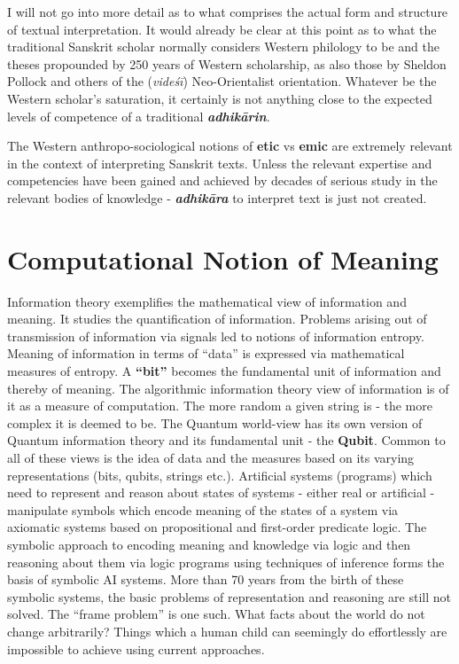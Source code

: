 I will not go into more detail as to what comprises the actual form and structure of textual interpretation. It would already be clear at this point as to what the traditional Sanskrit scholar normally considers Western philology to be and the theses propounded by 250 years of Western scholarship, as also those by Sheldon Pollock and others of the (\textit{videśī}) Neo-Orientalist orientation. Whatever be the Western scholar’s saturation, it certainly is not anything close to the expected levels of competence of a traditional \textbf{\textit{adhikārin}}.

The Western anthropo-sociological notions of \textbf{etic} vs \textbf{emic} are extremely relevant in the context of interpreting Sanskrit texts. Unless the relevant expertise and competencies have been gained and achieved by decades of serious study in the relevant bodies of knowledge - \textbf{\textit{adhikāra}} to interpret text is just not created.


\section*{Computational Notion of Meaning}

\vskip -6.5pt

Information theory exemplifies the mathematical view of information and meaning. It studies the quantification of information. Problems arising out of transmission of information via signals led to notions of information entropy. Meaning of information in terms of “data” is expressed via mathematical measures of entropy. A \textbf{“bit”} becomes the fundamental unit of information and thereby of meaning. The algorithmic information theory view of information is of it as a measure of computation. The more random a given string is - the more complex it is deemed to be. The Quantum world-view has its own version of Quantum information theory and its fundamental unit - the \textbf{Qubit}. Common to all of these views is the idea of data and the measures based on its varying representations (bits, qubits, strings etc.). Artificial systems (programs) which need to represent and reason about states of systems - either real or artificial - manipulate symbols which encode meaning of the states of a system via axiomatic systems based on propositional and first-order predicate logic. The symbolic approach to encoding meaning and knowledge via logic and then reasoning about them via logic programs using techniques of inference forms the basis of symbolic AI systems. More than 70 years from the birth of these symbolic systems, the basic problems of representation and reasoning are still not solved. The “frame problem” is one such. What facts about the world do not change arbitrarily? Things which a human child can seemingly do effortlessly are impossible to achieve using current approaches.

